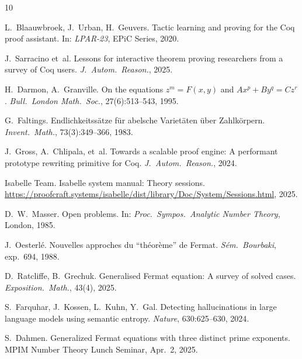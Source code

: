 \documentclass[runningheads]{llncs}
\begin{document}
\begin{thebibliography}{10}

L.~Blaauwbroek, J.~Urban, H.~Geuvers.
\newblock Tactic learning and proving for the {C}oq proof assistant.
\newblock In: \emph{LPAR-23}, EPiC Series, 2020.

J.~Sarracino et~al.
\newblock Lessons for interactive theorem proving researchers from a survey of
  {C}oq users.
\newblock \emph{J.\ Autom.\ Reason.}, 2025.

H.~Darmon, A.~Granville.
\newblock On the equations $z^m = F(x,y)$ and $Ax^p + By^q = Cz^r$.
\newblock \emph{Bull.\ London Math.\ Soc.}, 27(6):513--543, 1995.

G.~Faltings.
\newblock Endlichkeitss\"atze f\"ur abelsche {V}ariet\"aten \"uber
  {Z}ahlk\"orpern.
\newblock \emph{Invent.\ Math.}, 73(3):349--366, 1983.

J.~Gross, A.~Chlipala, et~al.
\newblock Towards a scalable proof engine: A performant prototype rewriting
  primitive for {C}oq.
\newblock \emph{J.\ Autom.\ Reason.}, 2024.

{Isabelle Team}.
\newblock Isabelle system manual: Theory sessions.
\newblock \url{https://proofcraft.systems/isabelle/dist/library/Doc/System/Sessions.html}, 2025.

D.~W.~Masser.
\newblock Open problems.
\newblock In: \emph{Proc.\ Sympos.\ Analytic Number Theory}, London, 1985.

J.~Oesterl\'e.
\newblock Nouvelles approches du ``th\'eor\`eme'' de {F}ermat.
\newblock \emph{S\'em.\ Bourbaki}, exp.~694, 1988.

D.~Ratcliffe, B.~Grechuk.
\newblock Generalised {F}ermat equation: A survey of solved cases.
\newblock \emph{Exposition.\ Math.}, 43(4), 2025.

S.~Farquhar, J.~Kossen, L.~Kuhn, Y.~Gal.
\newblock Detecting hallucinations in large language models using
  semantic entropy.
\newblock \emph{Nature}, 630:625--630, 2024.

S.~Dahmen.
\newblock Generalized {F}ermat equations with three distinct prime exponents.
\newblock MPIM Number Theory Lunch Seminar, Apr.~2, 2025.

\end{thebibliography}
\end{document}
